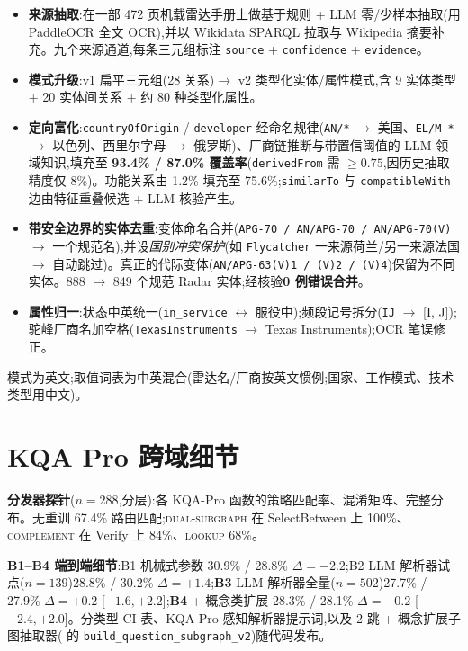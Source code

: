 \documentclass[11pt,a4paper]{article}
\newcommand{\op}[1]{\textsc{\small #1}}
\begin{document}
\begin{itemize}[topsep=0pt,itemsep=2pt,leftmargin=*]
  \item \textbf{来源抽取}:在一部 472 页机载雷达手册上做基于规则 + LLM 零/少样本抽取(用 PaddleOCR 全文 OCR),并以 Wikidata \citep{vrandecic2014wikidata} SPARQL 拉取与 Wikipedia 摘要补充。九个来源通道,每条三元组标注 \texttt{source} + \texttt{confidence} + \texttt{evidence}。
  \item \textbf{模式升级}:v1 扁平三元组(28 关系)$\to$ v2 类型化实体/属性模式,含 9 实体类型 + 20 实体间关系 + 约 80 种类型化属性。
  \item \textbf{定向富化}:\texttt{countryOfOrigin} / \texttt{developer} 经命名规律(\texttt{AN/*} $\to$ 美国、\texttt{EL/M-*} $\to$ 以色列、西里尔字母 $\to$ 俄罗斯)、厂商链推断与带置信阈值的 LLM 领域知识,填充至 \textbf{93.4\% / 87.0\% 覆盖率}(\texttt{derivedFrom} 需 $\geq 0.75$,因历史抽取精度仅 8\%)。功能关系由 1.2\% 填充至 75.6\%;\texttt{similarTo} 与 \texttt{compatibleWith} 边由特征重叠候选 + LLM 核验产生。
  \item \textbf{带安全边界的实体去重}:变体命名合并(\texttt{APG-70 / AN/APG-70 / AN/APG-70(V)} $\to$ 一个规范名),并设\emph{国别冲突保护}(如 \texttt{Flycatcher} 一来源荷兰/另一来源法国 $\to$ 自动跳过)。真正的代际变体(\texttt{AN/APG-63(V)1 / (V)2 / (V)4})保留为不同实体。888 $\to$ 849 个规范 Radar 实体;经核验\textbf{0 例错误合并}。
  \item \textbf{属性归一}:状态中英统一(\texttt{in\_service} $\leftrightarrow$ 服役中);频段记号拆分(\texttt{IJ} $\to$ [I, J]);驼峰厂商名加空格(\texttt{TexasInstruments} $\to$ Texas Instruments);OCR 笔误修正。
\end{itemize}

模式为英文;取值词表为中英混合(雷达名/厂商按英文惯例;国家、工作模式、技术类型用中文)。

\section{KQA Pro 跨域细节}
\label{app:kqapro}

\textbf{分发器探针}($n\!=\!288$,分层):各 KQA-Pro 函数的策略匹配率、混淆矩阵、完整分布。无重训 67.4\% 路由匹配;\op{dual-subgraph} 在 SelectBetween 上 100\%、\op{complement} 在 Verify 上 84\%、\op{lookup} 68\%。

\textbf{B1--B4 端到端细节}:B1 机械式参数 30.9\% / 28.8\% $\Delta=-2.2$;B2 LLM 解析器试点($n\!=\!139$)28.8\% / 30.2\% $\Delta=+1.4$;\textbf{B3} LLM 解析器全量($n\!=\!502$)27.7\% / 27.9\% $\Delta=+0.2$ [$-1.6, +2.2$];\textbf{B4} + 概念类扩展 28.3\% / 28.1\% $\Delta=-0.2$ [$-2.4, +2.0$]。分类型 CI 表、KQA-Pro 感知解析器提示词,以及 2 跳 + 概念扩展子图抽取器( 的 \texttt{build\_question\_subgraph\_v2})随代码发布。
\end{document}
